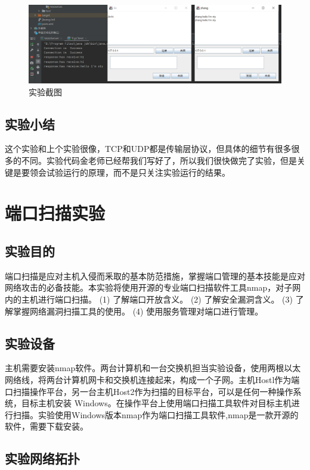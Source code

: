 \documentclass[lang=cn,11pt,a4paper,cite=authoryear]{elegantpaper}
\begin{document}
\begin{figure}[htbp]
	\centering
	\includegraphics[width=0.8\linewidth]{image/screenshot007}
	\caption{实验截图}
	\label{fig:screenshot007}
\end{figure}


\subsection{实验小结}
这个实验和上个实验很像，TCP和UDP都是传输层协议，但具体的细节有很多很多的不同。实验代码金老师已经帮我们写好了，所以我们很快做完了实验，但是关键是要领会试验运行的原理，而不是只关注实验运行的结果。
\section{端口扫描实验}
\subsection{实验目的}
端口扫描是应对主机入侵而釆取的基本防范措施，掌握端口管理的基本技能是应对网络攻击的必备技能。本实验将使用开源的专业端口扫描软件工具nmap，对子网内的主机进行端口扫描。
(1)	了解端口开放含义。
(2)	了解安全漏洞含义。
(3)	了解掌握网络漏洞扫描工具的使用。
(4)	使用服务管理对端口进行管理。

\subsection{实验设备}

主机需要安装nmap软件。两台计算机和一台交换机担当实验设备，使用两根以太网络线，将两台计算机网卡和交换机连接起来，构成一个子网。主机Hostl作为端口扫描操作平台，另一台主机Host2作为扫描的目标平台，可以是任何一种操作系统，目标主机安装 Windows。在操作平台上使用端口扫描工具软件对目标主机进行扫描。实验使用Windows版本nmap作为端口扫描工具软件,nmap是一款开源的软件，需要下载安装。

\subsection{实验网络拓扑}
\end{document}
